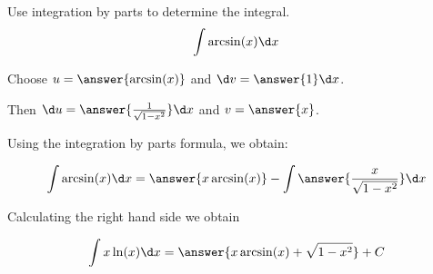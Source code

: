 \documentclass{ximera}
\author{Jason Miller}
\begin{document}
\begin{exercise}
Use integration by parts to determine the integral.
\[
\int \arcsin(x) \d x 
\]


Choose $u=\answer{ \arcsin(x) }$ and $\d v=\answer{1 }\d x$. 

Then $\d u= \answer{ \frac{1}{\sqrt{1-x^{2}}} } \d x$ and $v= \answer{x}$.

Using the integration by parts formula, we obtain:

\[
\int \arcsin(x) \d x= \answer{x\arcsin(x)} - \int \answer{ \frac{x}{\sqrt{1-x^{2}}} } \d x
\]

Calculating the right hand side we obtain

\[
\int x \ln(x) \d x= \answer{ x\arcsin(x) + \sqrt{1-x^{2}}           } + C
\]


\end{exercise}
\end{document}
